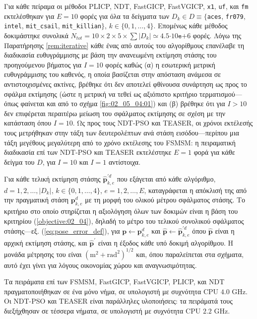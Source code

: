 Για κάθε πείραμα οι μέθοδοι PLICP, NDT, FastGICP, FastVGICP, \texttt{x1},
\texttt{uf}, και \texttt{fm} εκτελέσθηκαν για $E = 10$ φορές για όλα τα
δείγματα των $D_k \in D \equiv \{$\texttt{aces}, \texttt{fr079},
\texttt{intel}, \texttt{mit\_csail}, \texttt{mit\_killian}$\}$, $k \in
\{0,1,\dots,4\}$.  Επομένως κάθε μέθοδος δοκιμάστηκε συνολικά $N_{tot} = 10
\times 2 \times 5 \times \sum |D_k|\simeq 4.5$$\cdot10$$\texttt{e}$$+$$6$
φορές. Λόγω της Παρατήρησης \ref{rem:iterative} κάθε ένας από αυτούς του
αλγορίθμους επανέλαβε τη διαδικασία ευθυγράμμισης με βάση την ανανεωμένη
εκτίμηση στάσης του προηγούμενου βήματος για $I = 10$ φορές καθώς (α) η
εσωτερική μετρική ευθυγράμμισης του καθενός, η οποία βασίζεται στην απόσταση
ανάμεσα σε αντιστοιχισμένες ακτίνες, βρέθηκε ότι δεν αποτελεί φθίνουσα
συνάρτηση ως προς το σφάλμα εκτίμησης (ώστε η μετρική να τεθεί ως αξιόπιστο
κριτήριο τερματισμού---όπως φαίνεται και από το σχήμα \ref{fig:02_05_04:01})
και (β) βρέθηκε ότι για $I > 10$ δεν επιφέρεται περαιτέρω μείωση του σφάλματος
εκτίμησης σε σχέση με την κατάσταση όπου $I=10$.  Ως προς τους NDT-PSO και
TEASER, οι χρόνοι εκτέλεσής τους μετρήθηκαν στην τάξη των δευτερολέπτων ανά
στάση εισόδου---περίπου μια τάξη μεγέθους μεγαλύτερη από το χρόνο εκτέλεσης του
FSMSM: η πειραματική διαδικασία επί των NDT-PSO και TEASER εκτελέστηκε $E=1$
φορά για κάθε δείγμα του $D$, για $I=10$ και $I=1$ αντίστοιχα.

Για κάθε τελική εκτίμηση στάσης $\hat{\bm{p}}_{k,e}^{\prime d}$ που εξάγεται
από κάθε αλγόριθμο, $d = 1,2,\dots,|D_k|$, $k \in \{0,1,\dots,4\}$,
$e=1,2,\dots,E$, καταγράφεται η απόκλισή της από την πραγματική στάση
$\bm{p}_{k,e}^d$ με τη μορφή του ολικού μέτρου σφάλματος στάσης. Το κριτήριο
στο οποίο στηρίζεται η αξιολόγηση όλων των δοκιμών είναι η βάση του κριτηρίου
(\ref{objective:02_04}), δηλαδή το μέτρο του τελικού συνολικού σφάλματος
στάσης---εξ. (\ref{eq:pose_error_def}), για $\bm{p} \leftarrow \bm{p}^d_{k,e}$
και $\hat{\bm{p}} \leftarrow \hat{\bm{p}}^{\prime d}_{k,e}$ όπου $\hat{\bm{p}}$
είναι η αρχική εκτίμηση στάσης, και $\hat{\bm{p}}^\prime$ είναι η έξοδος κάθε
υπό δοκιμή αλγορίθμου. Η μονάδα μέτρησης του είναι
$(\text{m}^2+\text{rad}^2)^{1/2}$ και, όπου παραλείπεται στα σχήματα, αυτό έχει
γίνει για λόγους οικονομίας χώρου και αναγνωσιμότητας.

Τα πειράματα επί των FSMSM, FastGICP, FastVGICP, PLICP, και NDT
πραγματοποιήθηκαν σε ένα μόνο νήμα, σε υπολογιστή με συχνότητα CPU $4.0$ GHz.
Οι NDT-PSO και TEASER είναι παράλληλες υλοποιήσεις: τα πειράματά τους
διεξήχθησαν σε τέσσερα νήματα, σε υπολογιστή με συχνότητα CPU $2.2$ GHz.



